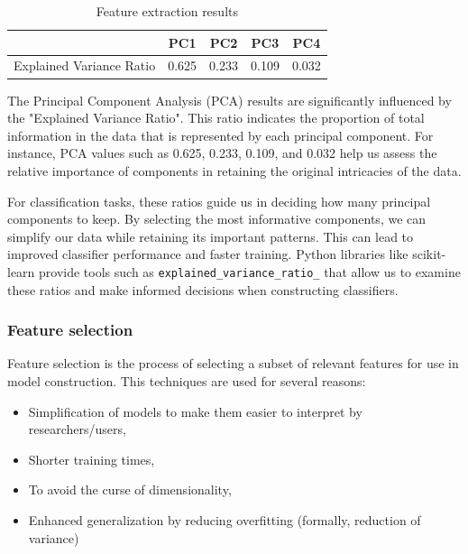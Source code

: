 \documentclass[conference,onecolumn]{IEEEtran}
\begin{document}
            \begin{table}[H]
                \centering
                \begin{tabular}{c|c|c|c|c}
                    \hline
                    &   PC1 &   PC2 &   PC3 &   PC4 \\  \hline
                    \hline
                    Explained Variance Ratio   & 0.625   & 0.233   & 0.109   & 0.032   \\
                    \hline
                \end{tabular}
                \caption{Feature extraction results}
                \label{table:featureExtractionResults}
            \end{table}

            The Principal Component Analysis (PCA) results are significantly influenced by the "Explained Variance Ratio". This ratio indicates the proportion of total information in the data that is represented by each principal component. For instance, PCA values such as 0.625, 0.233, 0.109, and 0.032 help us assess the relative importance of components in retaining the original intricacies of the data.

            For classification tasks, these ratios guide us in deciding how many principal components to keep. By selecting the most informative components, we can simplify our data while retaining its important patterns. This can lead to improved classifier performance and faster training. Python libraries like scikit-learn provide tools such as \texttt{explained\_variance\_ratio\_} that allow us to examine these ratios and make informed decisions when constructing classifiers.


        \subsubsection{Feature selection}
            Feature selection is the process of selecting a subset of relevant features for use in model construction. This techniques are used for several reasons:
            \begin{itemize}
                \item Simplification of models to make them easier to interpret by researchers/users,
                \item Shorter training times,
                \item To avoid the curse of dimensionality,
                \item Enhanced generalization by reducing overfitting (formally, reduction of variance)
            \end{itemize}
\end{document}
